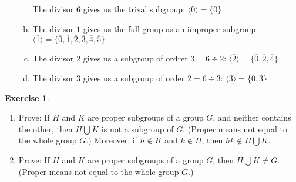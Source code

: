 \documentclass[11pt,oneside]{article}
\numberwithin{equation}{section}
\theoremstyle{definition}
\newtheorem{exercise}{Exercise}
\begin{document}
\begin{solution}
\begin{enumerate}[(1)]
\begin{enumerate}[(a)]
    The divisor $ 6 $ gives us the trival subgroup: $ \langle \overline 0 \rangle =  \{ \overline 0 \} $
\item
    The divisor $ 1 $ gives us the full group as an improper subgroup: $ \langle \overline 1 \rangle  = \{ \overline 0, \overline 1, \overline 2, \overline 3, \overline 4, \overline 5 \} $
  \item
    The divisor $ 2 $ gives us a subgroup of ordrer $ 3 = 6 \div 2 $: $\langle \overline 2 \rangle  = \{ \overline 0, \overline  2, \overline  4 \} $
  \item
    The divisor $3 $ gives us a subgroup of order $ 2 = 6 \div 3 $: $ \langle \overline 3 \rangle  = \{ \overline 0, \overline  3 \} $ 

\end{enumerate}

\end{enumerate}
\end{solution}

\begin{exercise}
\begin{enumerate}[(1)]
\item 
  Prove: If $H$ and $K$ are proper subgroups of a group $G$, and
  neither contains the other, then $H \bigcup K $ is not a subgroup of
  $G$.  (Proper means not equal to the whole group $G$.)  Moreover,
  if $h \notin K$ and $k \notin H$, then $ hk \notin H \bigcup K$. 
\item 
  Prove: If $H$ and $K$ are proper subgroups of a group $G$, then $H
  \bigcup K \neq G $.  (Proper means not equal to
  the whole group $G$.)
\end{enumerate}  
\end{exercise}
\end{document}
